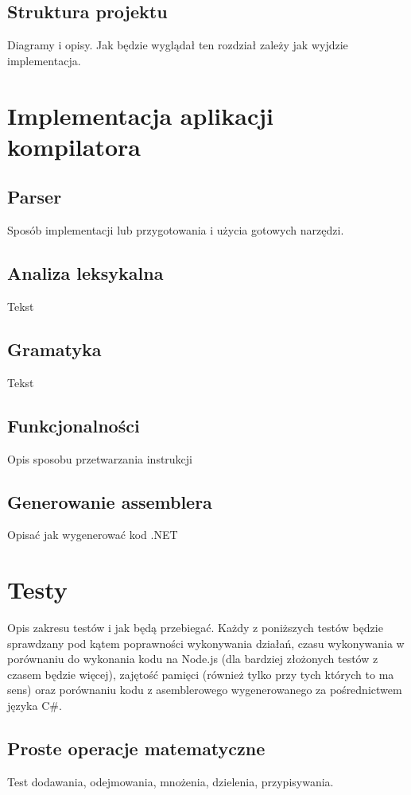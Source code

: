 \documentclass[a4paper]{article}
\begin{document}
\subsection{Struktura projektu}
Diagramy i opisy.
Jak będzie wyglądał ten rozdział zależy jak wyjdzie implementacja.

\section{Implementacja aplikacji kompilatora}
\subsection{Parser}
Sposób implementacji lub przygotowania i użycia gotowych narzędzi.

\subsection{Analiza leksykalna}
Tekst
\subsection{Gramatyka}
Tekst
\subsection{Funkcjonalności}
Opis sposobu przetwarzania instrukcji
\subsection{Generowanie assemblera}
Opisać jak wygenerować kod .NET

\section{Testy}
Opis zakresu testów i jak będą przebiegać.
Każdy z poniższych testów będzie sprawdzany pod kątem poprawności wykonywania działań, czasu wykonywania w porównaniu do wykonania kodu na Node.js (dla bardziej złożonych testów z czasem będzie więcej), zajętość pamięci (również tylko przy tych których to ma sens) oraz porównaniu kodu z asemblerowego wygenerowanego za pośrednictwem języka C\#.

\subsection{Proste operacje matematyczne}
Test dodawania, odejmowania, mnożenia, dzielenia, przypisywania.
\end{document}
